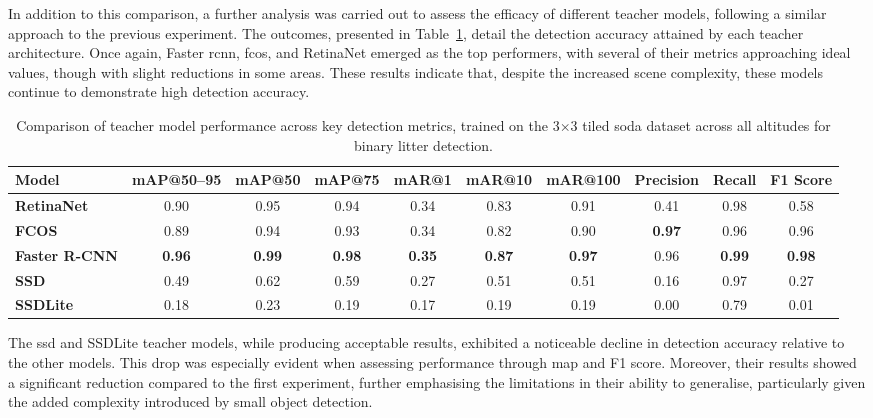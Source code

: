 In addition to this comparison, a further analysis was carried out to assess the efficacy of different teacher models, following a similar approach to the previous experiment. The outcomes, presented in Table~\ref{tab:teacher_model_metrics_soda_tiled_single}, detail the detection accuracy attained by each teacher architecture. Once again, Faster \gls{rcnn}, \gls{fcos}, and RetinaNet emerged as the top performers, with several of their metrics approaching ideal values, though with slight reductions in some areas. These results indicate that, despite the increased scene complexity, these models continue to demonstrate high detection accuracy.

\begin{table}[!ht]
    \centering
    \begin{adjustbox}{max width=\textwidth}
    \renewcommand{\arraystretch}{1.5}
    \begin{tabular}{|l|c|c|c|c|c|c|c|c|c|}
        \hline
        \textbf{Model} & \textbf{mAP@50--95} & \textbf{mAP@50} & \textbf{mAP@75} & \textbf{mAR@1} & \textbf{mAR@10} & \textbf{mAR@100} & \textbf{Precision} & \textbf{Recall} & \textbf{F1 Score} \\ \hline \hline
        \textbf{RetinaNet} & 0.90 & 0.95 & 0.94 & 0.34 & 0.83 & 0.91 & 0.41 & 0.98 & 0.58 \\\hline
        \textbf{FCOS} & 0.89 & 0.94 & 0.93 & 0.34 & 0.82 & 0.90 & \textbf{0.97} & 0.96 & 0.96 \\\hline
        \textbf{Faster R-CNN} & \textbf{0.96} & \textbf{0.99} & \textbf{0.98} & \textbf{0.35} & \textbf{0.87} & \textbf{0.97} & 0.96 & \textbf{0.99} & \textbf{0.98} \\\hline
        \textbf{SSD} & 0.49 & 0.62 & 0.59 & 0.27 & 0.51 & 0.51 & 0.16 & 0.97 & 0.27 \\\hline
        \textbf{SSDLite} & 0.18 & 0.23 & 0.19 & 0.17 & 0.19 & 0.19 & 0.00 & 0.79 & 0.01 \\
        \hline
    \end{tabular}
    \renewcommand{\arraystretch}{1}
    \end{adjustbox}
    \caption{Comparison of teacher model performance across key detection metrics, trained on the 3$\times$3 tiled \gls{soda} dataset across all altitudes for binary litter detection.}
    \label{tab:teacher_model_metrics_soda_tiled_single}
\end{table}

The \gls{ssd} and SSDLite teacher models, while producing acceptable results, exhibited a noticeable decline in detection accuracy relative to the other models. This drop was especially evident when assessing performance through \gls{map} and F1 score. Moreover, their results showed a significant reduction compared to the first experiment, further emphasising the limitations in their ability to generalise, particularly given the added complexity introduced by small object detection.


